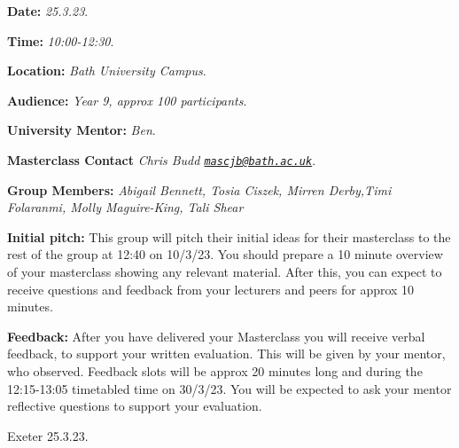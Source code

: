 \documentclass[
]{book}
\newenvironment{information}{
  \definecolor{shadecolor}{rgb}{0.8, 0.9,1.0}
  \definecolor{text-colour}{rgb}{0, 0.25, 0.52}
  \color{text-colour}
  \begin{shaded}}
 {\end{shaded}}
\begin{document}
\begin{information}
\textbf{Date:} \emph{25.3.23}.

\textbf{Time:} \emph{10:00-12:30}.

\textbf{Location:} \emph{Bath University Campus}.

\textbf{Audience:} \emph{Year 9, approx 100 participants}.

\textbf{University Mentor:} \emph{Ben}.

\textbf{Masterclass Contact} \emph{Chris Budd \href{mailto:mascjb@bath.ac.uk}{\nolinkurl{mascjb@bath.ac.uk}}}.

\textbf{Group Members:} \emph{Abigail Bennett, Tosia Ciszek, Mirren Derby,Timi Folaranmi, Molly Maguire-King, Tali Shear}

\textbf{Initial pitch:} This group will pitch their initial ideas for their masterclass to the rest of the group at 12:40 on 10/3/23. You should prepare a 10 minute overview of your masterclass showing any relevant material. After this, you can expect to receive questions and feedback from your lecturers and peers for approx 10 minutes.

\textbf{Feedback:} After you have delivered your Masterclass you will receive verbal feedback, to support your written evaluation. This will be given by your mentor, who observed. Feedback slots will be approx 20 minutes long and during the 12:15-13:05 timetabled time on 30/3/23. You will be expected to ask your mentor reflective questions to support your evaluation.

\end{information}

Exeter 25.3.23.
\end{document}
